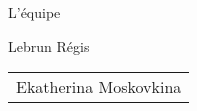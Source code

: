 \begin{frame}{L'équipe}
\begin{minipage}{0.45\textwidth}
Lebrun Régis
\end{minipage}%
\hfill
\begin{minipage}{0.45\textwidth}
\begin{tabular}{|p{\textwidth}}
Ekatherina Moskovkina
\end{tabular}
\end{minipage}%
\end{frame}